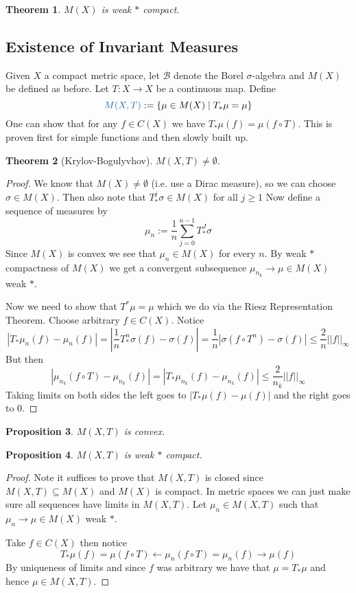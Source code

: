 \documentclass[11pt]{article}
\newcommand{\defeq}{:=}
\newcommand{\abs}[1]{\left|#1\right|}
\newcommand{\norm}[1]{\left|\left|#1\right|\right|}
\newcommand{\relmiddle}[1]{\mathrel{}\middle#1\mathrel{}}
\newcommand{\rmv}{\relmiddle|}
\newcommand{\mdf}[1]{{\color{RoyalBlue} #1}}
\newtheorem{prop}{Proposition}[section]
\newtheorem{theorem}[prop]{Theorem}
\begin{document}
\begin{theorem}
$M(X)$ is weak $\ast$ compact.
\end{theorem}

\subsection{Existence of Invariant Measures}
Given $X$ a compact metric space, let $\mathcal{B}$ denote the Borel $\sigma$-algebra and $M(X)$ be defined as before.
Let $T:X\to X$ be a continuous map.
Define
\[
	\mdf{M(X, T)}\defeq \left\{ \mu\in M(X) \rmv T_\ast \mu = \mu\right\}
\]
One can show that for any $f\in C(X)$ we have $T_\ast\mu(f) = \mu(f\circ T)$.
This is proven first for simple functions and then slowly built up.

\begin{theorem}[Krylov-Bogulyvhov]
$M(X, T)\neq \emptyset$.
\end{theorem}

\begin{proof}
We know that $M(X) \neq \emptyset$ (i.e. use a Dirac measure), so we can choose $\sigma \in M(X)$.
Then also note that $T_\ast^j \sigma\in M(X)$ for all $j \geq 1$
Now define a sequence of measures by
\[
	\mu_n \defeq \frac{1}{n}\sum_{j=0}^{n-1}T_\ast^J \sigma
\]
Since $M(X)$ is convex we see that $\mu_n\in M(X)$ for every $n$.
By weak $\ast$ compactness of $M(X)$ we get a convergent subsequence $\mu_{n_k}\to \mu\in M(X)$ weak $\ast$.

Now we need to show that $T^\ast \mu=\mu$ which we do via the Riesz Representation Theorem.
Choose arbitrary $f\in C(X)$.
Notice 
\[
\abs{T_\ast \mu_n(f) - \mu_n(f)} = \abs{ \frac{1}{n}T_\ast^n\sigma(f) - \sigma(f)} = \frac{1}{n}\abs{\sigma(f \circ T^n) - \sigma(f)} \leq \frac{2}{n}\norm{f}_\infty
\]
But then
\[
\abs{\mu_{n_k}(f \circ T) - \mu_{n_k} (f) } = \abs{T_\ast \mu_{n_k} (f) - \mu_{n_k} (f)} \leq \frac{2}{n_k}\norm{f}_\infty
\]
Taking limits on both sides the left goes to $\abs{T_\ast\mu(f) - \mu(f)}$ and the right goes to $0$.
\end{proof}

\begin{prop}
$M(X, T)$ is convex.
\end{prop}

\begin{prop}
$M(X, T)$ is weak $\ast$ compact.
\end{prop}

\begin{proof}
Note it suffices to prove that $M(X, T)$ is closed since $M(X, T)\subseteq M(X)$ and $M(X)$ is compact.
In metric spaces we can just make sure all sequences have limits in $M(X, T)$.
Let $\mu_n\in M(X, T)$ such that $\mu_n \to \mu\in M(X)$ weak $\ast$.

Take $f\in C(X)$ then notice
\[
	T_\ast\mu(f) = \mu(f\circ T) \leftarrow \mu_n (f\circ T) = \mu_n (f) \to \mu(f)
\]
By uniqueness of limits and since $f$ was arbitrary we have that $\mu = T_\ast \mu$ and hence $\mu\in M(X, T)$.
\end{proof}
\end{document}
